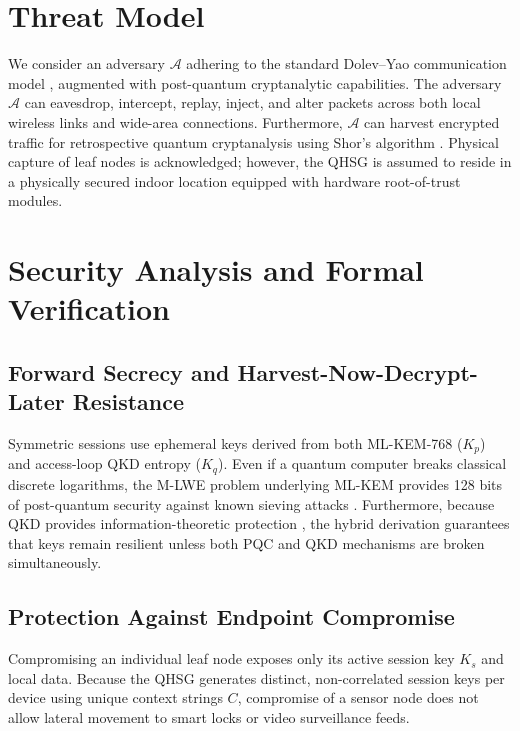 \documentclass[journal]{IEEEtran}
\begin{document}
\section{Threat Model}

We consider an adversary $\mathcal{A}$ adhering to the standard Dolev--Yao communication
model \cite{dolev1983security}, augmented with post-quantum cryptanalytic capabilities.
The adversary $\mathcal{A}$ can eavesdrop, intercept, replay, inject, and alter packets across
both local wireless links and wide-area connections. Furthermore, $\mathcal{A}$ can harvest
encrypted traffic for retrospective quantum cryptanalysis using Shor's algorithm \cite{mosca}.
Physical capture of leaf nodes is acknowledged; however, the QHSG is assumed to reside in a
physically secured indoor location equipped with hardware root-of-trust modules.


\section{Security Analysis and Formal Verification}

\subsection{Forward Secrecy and Harvest-Now-Decrypt-Later Resistance}
Symmetric sessions use ephemeral keys derived from both ML-KEM-768 ($K_p$) and access-loop
QKD entropy ($K_q$). Even if a quantum computer breaks classical discrete logarithms,
the M-LWE problem underlying ML-KEM provides 128 bits of post-quantum security against
known sieving attacks \cite{nist203,alkim2016kyber}. Furthermore, because QKD provides
information-theoretic protection \cite{scarani}, the hybrid derivation guarantees that
keys remain resilient unless both PQC and QKD mechanisms are broken simultaneously.

\subsection{Protection Against Endpoint Compromise}
Compromising an individual leaf node exposes only its active session key $K_s$ and local
data. Because the QHSG generates distinct, non-correlated session keys per device using
unique context strings $C$, compromise of a sensor node does not allow lateral movement
to smart locks or video surveillance feeds.
\end{document}
